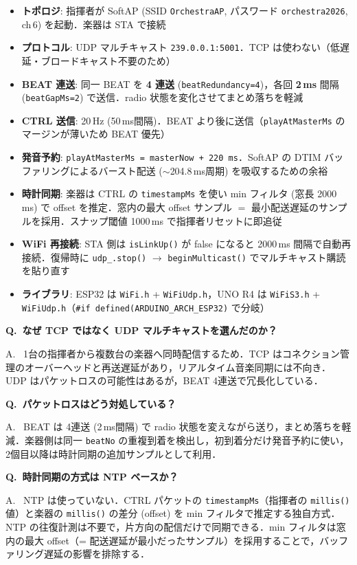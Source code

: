\documentclass[uplatex,dvipdfmx,a4paper,10pt]{jsarticle}
\newcommand{\QA}[2]{%
  \par\noindent\textbf{\textcolor{qcolor}{Q.~#1}}%
  \par\noindent\textcolor{acolor}{A.~#2}\medskip%
}
\begin{document}
\begin{tcolorbox}[cheatbox, title=実装要点]
\begin{itemize}
  \item \textbf{トポロジ}: 指揮者が SoftAP (SSID \texttt{OrchestraAP}, パスワード \texttt{orchestra2026}, ch\,6) を起動．楽器は STA で接続
  \item \textbf{プロトコル}: UDP マルチキャスト \texttt{239.0.0.1:5001}．TCP は使わない（低遅延・ブロードキャスト不要のため）
  \item \textbf{BEAT 連送}: 同一 BEAT を \textbf{4 連送} (\texttt{beatRedundancy=4})，各回 \textbf{2\,ms} 間隔 (\texttt{beatGapMs=2}) で送信．radio 状態を変化させてまとめ落ちを軽減
  \item \textbf{CTRL 送信}: 20\,Hz (50\,ms間隔)．BEAT より後に送信（\texttt{playAtMasterMs} のマージンが薄いため BEAT 優先）
  \item \textbf{発音予約}: \texttt{playAtMasterMs = masterNow + 220\,ms}．SoftAP の DTIM バッファリングによるバースト配送 ($\sim$204.8\,ms周期) を吸収するための余裕
  \item \textbf{時計同期}: 楽器は CTRL の \texttt{timestampMs} を使い min フィルタ (窓長 2000\,ms) で offset を推定．窓内の最大 offset サンプル $=$ 最小配送遅延のサンプルを採用．スナップ閾値 1000\,ms で指揮者リセットに即追従
  \item \textbf{WiFi 再接続}: STA 側は \texttt{isLinkUp()} が false になると 2000\,ms 間隔で自動再接続．復帰時に \texttt{udp\_.stop()} $\to$ \texttt{beginMulticast()} でマルチキャスト購読を貼り直す
  \item \textbf{ライブラリ}: ESP32 は \texttt{WiFi.h} + \texttt{WiFiUdp.h}，UNO R4 は \texttt{WiFiS3.h} + \texttt{WiFiUdp.h}（\texttt{\#if defined(ARDUINO\_ARCH\_ESP32)} で分岐）
\end{itemize}
\end{tcolorbox}

\QA{なぜ TCP ではなく UDP マルチキャストを選んだのか？}{
1台の指揮者から複数台の楽器へ同時配信するため．TCP はコネクション管理のオーバーヘッドと再送遅延があり，リアルタイム音楽同期には不向き．UDP はパケットロスの可能性はあるが，BEAT 4連送で冗長化している．}

\QA{パケットロスはどう対処している？}{
BEAT は 4連送 (2\,ms間隔) で radio 状態を変えながら送り，まとめ落ちを軽減．楽器側は同一 \texttt{beatNo} の重複到着を検出し，初到着分だけ発音予約に使い，2個目以降は時計同期の追加サンプルとして利用．}

\QA{時計同期の方式は NTP ベースか？}{
NTP は使っていない．CTRL パケットの \texttt{timestampMs}（指揮者の \texttt{millis()} 値）と楽器の \texttt{millis()} の差分 (offset) を min フィルタで推定する独自方式．NTP の往復計測は不要で，片方向の配信だけで同期できる．min フィルタは窓内の最大 offset（= 配送遅延が最小だったサンプル）を採用することで，バッファリング遅延の影響を排除する．}
\end{document}
